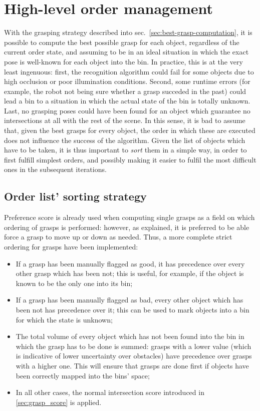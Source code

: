 \section{High-level order management} \label{sec:order-list}
With the grasping strategy described into
sec.~\ref{sec:best-grasp-computation}, it is possible to compute the
best possible grasp for each object, regardless of the current order
state, and assuming to be in an ideal situation in which the exact
pose is well-known for each object into the bin. In practice, this is
at the very least ingenuous: first, the recognition algorithm could
fail for some objects due to high occlusion or poor illumination
conditions. Second, some runtime errors (for example, the robot not
being sure whether a grasp succeded in the past) could lead a bin to a
situation in which the actual state of the bin is totally
unknown. Last, no grasping poses could have been found for an object
which guarantee no intersections at all with the rest of the scene. In
this sense, it is bad to assume that, given the best grasps for every
object, the order in which these are executed does not influence the
success of the algorithm. Given the list of objects which have to be
taken, it is thus important to \emph{sort} them in a simple way, in
order to first fulfill simplest orders, and possibly making it easier
to fulfil the most difficult ones in the subsequent iterations.

\subsection{Order list' sorting strategy} \label{sec:sort-order}
Preference score is already used when computing single grasps as a field on which ordering of
grasps is performed: however, as explained, it is preferred to be able
force a grasp to move up or down as needed. Thus, a more complete strict
ordering for grasps have been implemented:
\begin{itemize}
\item {If a grasp has been manually flagged as good, it has
  precedence over every other grasp which has been not; this is
  useful, for example, if the object is known to be the only one into
  its bin;}
\item{If a grasp has been manually flagged as bad, every other object
  which has been not has precedence over it; this can be used to mark
  objects into a bin for which the state is unknown;}
\item{The total volume of every object which has not been found into
  the bin in which the grasp has to be done is summed: grasps with a
  lower value (which is indicative of lower uncertainty over
  obstacles) have precedence over grasps with a higher one. This
  will ensure that grasps are done first if objects have been
  correctly mapped into the bins' space;}
\item{In all other cases, the normal intersection score introduced
  in \ref{sec:grasp_score} is applied.}
\end{itemize}

